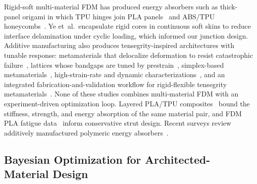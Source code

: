\documentclass[lineno,nocopyright,upint,varvw,hyphenate]{asmejour}
\begin{document}
Rigid-soft multi-material FDM has produced energy absorbers such as
thick-panel origami in which TPU hinges join PLA
panels~\cite{ye2023multimaterial} and ABS/TPU
honeycombs~\cite{khatri2024energy}. Ye et~al.\ encapsulate rigid cores
in continuous soft skins to reduce interface delamination under cyclic
loading, which informed our junction design. Additive manufacturing also
produces tensegrity-inspired architectures with tunable response:
metamaterials that delocalize deformation to resist catastrophic
failure~\cite{bauer2021tensegrity}, lattices whose bandgaps are tuned
by prestrain~\cite{pajunen2021prestrain}, simplex-based
metamaterials~\cite{sabounizawadzka2024experimental}, high-strain-rate
and dynamic characterizations~\cite{almeida2025highstrainrate,
davami2025dynamicanalysis}, and an integrated fabrication-and-validation
workflow for rigid-flexible tensegrity
metamaterials~\cite{wang2026integrated}. None of these studies combines
multi-material FDM with an experiment-driven optimization loop. Layered
PLA/TPU composites~\citep{arifvianto2022mechanicalpropertiesof} bound
the stiffness, strength, and energy absorption of the same material
pair, and FDM PLA fatigue data~\citep{ezeh2018onthefatigue,
vanaei2021multiscaledamageanalysis} inform conservative strut design.
Recent surveys review additively manufactured polymeric energy
absorbers~\citep{bustihan2026recentadvancesin,
liu2026threedimensionalprintedlattice}.

\subsection{Bayesian Optimization for Architected-Material Design}
\end{document}
